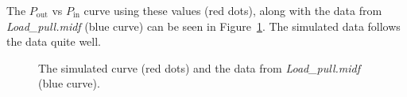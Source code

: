 \documentclass[12pt,a4paper]{article}
\begin{document}
The $P_\text{out}$ vs $P_\text{in}$ curve using these values (red dots), along with the data from \textit{Load\_pull.midf} (blue curve) can be seen in Figure~\ref{fig:pout_pin}. The simulated data follows the data quite well.
\begin{figure}[h]
  \centering
  \noindent{}
  \caption{The simulated curve (red dots) and the data from \textit{Load\_pull.midf} (blue curve).}
  \label{fig:pout_pin}
\end{figure}
\end{document}
